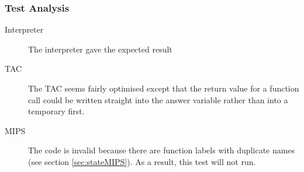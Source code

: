 \subsubsection{Test Analysis}
\begin{description}
	\item[Interpreter] The interpreter gave the expected result
	\item[TAC] The TAC seems fairly optimised except that the return value for a function call could be written straight into the answer variable rather than into a temporary first.
	\item[MIPS] The code is invalid because there are function labels with duplicate names (see section \ref{sec:stateMIPS}). As a result, this test will not run.
\end{description}

